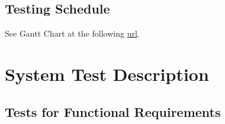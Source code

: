 \documentclass[12pt, titlepage]{article}
\begin{document}
	\subsection{Testing Schedule}
	
	See Gantt Chart at the following  \href{https://gitlab.cas.mcmaster.ca/carriedd/Tetris_Tussle/-/tree/master/ProjectSchedule}{url}. 
	
	\section{System Test Description}
	
	\subsection{Tests for Functional Requirements}
	
\end{document}
